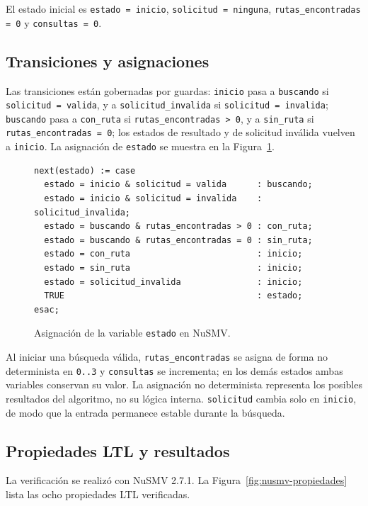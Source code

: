 El estado inicial es \texttt{estado = inicio}, \texttt{solicitud = ninguna}, \texttt{rutas\_encontradas = 0} y \texttt{consultas = 0}.

\subsection{Transiciones y asignaciones}
\label{sec:nusmv-transiciones}

Las transiciones están gobernadas por guardas: \texttt{inicio} pasa a \texttt{buscando} si \texttt{solicitud = valida}, y a \texttt{solicitud\_invalida} si \texttt{solicitud = invalida}; \texttt{buscando} pasa a \texttt{con\_ruta} si \texttt{rutas\_encontradas > 0}, y a \texttt{sin\_ruta} si \texttt{rutas\_encontradas = 0}; los estados de resultado y de solicitud inválida vuelven a \texttt{inicio}. La asignación de \texttt{estado} se muestra en la Figura~\ref{fig:nusmv-transiciones}.

\begin{figure}[!t]
\centering
\begin{lstlisting}
next(estado) := case
  estado = inicio & solicitud = valida      : buscando;
  estado = inicio & solicitud = invalida    : solicitud_invalida;
  estado = buscando & rutas_encontradas > 0 : con_ruta;
  estado = buscando & rutas_encontradas = 0 : sin_ruta;
  estado = con_ruta                         : inicio;
  estado = sin_ruta                         : inicio;
  estado = solicitud_invalida               : inicio;
  TRUE                                      : estado;
esac;
\end{lstlisting}
\caption{Asignación de la variable \texttt{estado} en NuSMV.}
\label{fig:nusmv-transiciones}
\end{figure}

Al iniciar una búsqueda válida, \texttt{rutas\_encontradas} se asigna de forma no determinista en \texttt{0..3} y \texttt{consultas} se incrementa; en los demás estados ambas variables conservan su valor. La asignación no determinista representa los posibles resultados del algoritmo, no su lógica interna. \texttt{solicitud} cambia solo en \texttt{inicio}, de modo que la entrada permanece estable durante la búsqueda.

\subsection{Propiedades LTL y resultados}
\label{sec:nusmv-resultados}

La verificación se realizó con NuSMV 2.7.1. La Figura~\ref{fig:nusmv-propiedades} lista las ocho propiedades LTL verificadas.

